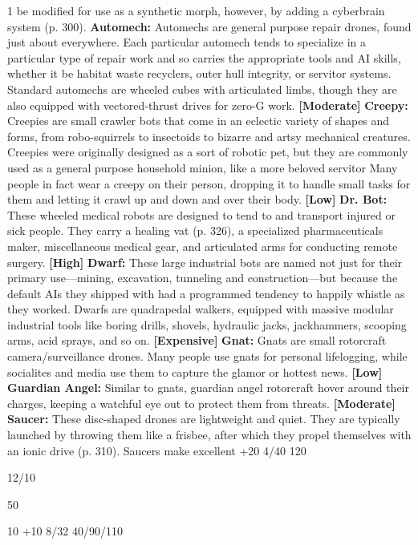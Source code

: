1
be modified for use as a synthetic morph, however, by 
adding a cyberbrain system (p. 300).
\textbf{Automech: }Automechs are general purpose repair 
drones, found just about everywhere. Each particular 
automech tends to specialize in a particular type of 
repair work and so carries the appropriate tools and 
AI skills, whether it be habitat waste recyclers, outer 
hull integrity, or servitor systems. Standard automechs 
are wheeled cubes with articulated limbs, though they 
are also equipped with vectored-thrust drives for 
zero-G work. \textbf{[Moderate]}
\textbf{Creepy: }Creepies are small crawler bots that come 
in an eclectic variety of shapes and forms, from robo-squirrels
to insectoids to bizarre and artsy mechanical
creatures. Creepies were originally designed as a sort of 
robotic pet, but they are commonly used as a general 
purpose household minion, like a more beloved servitor
Many people in fact wear a creepy on their person,
dropping it to handle small tasks for them and letting it 
crawl up and down and over their body. \textbf{[Low]}
\textbf{Dr. Bot:} These wheeled medical robots are designed 
to tend to and transport injured or sick people. They 
carry a healing vat (p. 326), a specialized pharmaceuticals
maker, miscellaneous medical gear, and articulated
arms for conducting remote surgery. \textbf{[High]}
\textbf{Dwarf:} These large industrial bots are named not 
just for their primary use—mining, excavation, tunneling
and construction—but because the default
AIs they shipped with had a programmed tendency 
to happily whistle as they worked. Dwarfs are quadrapedal
walkers, equipped with massive modular
industrial tools like boring drills, shovels, hydraulic 
jacks, jackhammers, scooping arms, acid sprays, and 
so on. \textbf{[Expensive]}
\textbf{Gnat:} Gnats are small rotorcraft camera/surveillance
drones. Many people use gnats for personal
lifelogging, while socialites and media use them to 
capture the glamor or hottest news. \textbf{[Low]}
\textbf{Guardian Angel:} Similar to gnats, guardian angel rotorcraft
hover around their charges, keeping a watchful
eye out to protect them from threats. \textbf{[Moderate]}
\textbf{Saucer:} These disc-shaped drones are lightweight 
and quiet. They are typically launched by throwing 
them like a frisbee, after which they propel themselves 
with an ionic drive (p. 310). Saucers make excellent 
+20
4/40
120

12/10

50

10
+10
8/32
40/90/110

